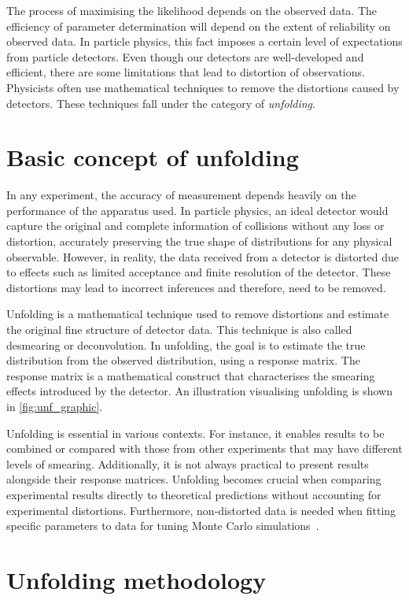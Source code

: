 The process of maximising the likelihood depends on the observed data. The efficiency of parameter determination
will depend on the extent of reliability on observed data. In particle physics, this fact imposes a 
certain level of expectations from particle detectors. Even though our detectors are well-developed
and efficient, there are some limitations that lead to distortion of observations. Physicists often use
mathematical techniques to remove the distortions caused by detectors. These techniques fall under the
category of \textit{unfolding}.  

\section{Basic concept of unfolding}

In any experiment, the accuracy of measurement depends heavily on the performance of the apparatus 
used. In particle physics, an ideal detector would capture the original and complete information 
of collisions without any loss or distortion, accurately preserving the true shape
of distributions for any physical observable. However, in reality, the data received 
from a detector is distorted due to effects such as limited acceptance and 
finite resolution of the detector. These distortions may lead to incorrect inferences and
therefore, need to be removed.

Unfolding is a mathematical technique used to remove distortions and estimate the original
fine structure of detector data. This technique is also called desmearing or deconvolution.
In unfolding, the goal is to estimate the true distribution from the observed distribution, 
using a response matrix. The response matrix is a mathematical construct that 
characterises the smearing effects introduced by the detector. An illustration visualising 
unfolding is shown in \cref{fig:unf_graphic}.

Unfolding is essential in various contexts. For instance, it enables results to be 
combined or compared with those from other experiments that may have different 
levels of smearing. Additionally, it is not always practical to present results alongside 
their response matrices. Unfolding becomes crucial when comparing experimental 
results directly to theoretical predictions without accounting for experimental 
distortions. Furthermore, non-distorted data is needed when fitting specific parameters to 
data for tuning Monte Carlo simulations~\cite{Lyons:2011cli}.


\section{Unfolding methodology}
\label{sec:unfmethod}

